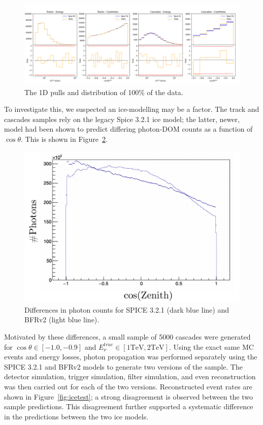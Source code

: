 \documentclass[main.tex]{subfiles}
\begin{document}
\begin{figure}
    \centering
    \includegraphics[width=0.9\linewidth]{./figures/goodness_joint_data_full_IC86_data_full.png}
    \caption{The 1D pulls and distribution of 100\% of the data.}\label{fig:1d_100p_distrib}
\end{figure}


To investigate this, we suspected an ice-modelling may be a factor. 
The track and cascades samples rely on the legacy Spice 3.2.1 ice model; the latter, newer, model had been shown to predict differing photon-DOM counts as a function of $\cos\theta$.  
This is shown in Figure~\ref{fig:zenith_bfr}.

\begin{figure}
    \centering
    \includegraphics[width=0.75\linewidth]{./figures/ice_investigate/zenith_bfr.png}
    \caption{Differences in photon counts for SPICE 3.2.1 (dark blue line) and BFRv2 (light blue line).}\label{fig:zenith_bfr}
\end{figure}

Motivated by these differences, a small sample of 5000 cascades were generated for $\cos\theta\in\left[-1.0, -0.9\right]$ and $E_{\nu}^{true}\in\left[1\text{TeV}, 2\text{TeV}\right]$. 
Using the exact same MC events and energy losses, photon propagation was performed separately using the SPICE 3.2.1 and BFRv2 models to generate two versions of the sample.
The detector simulation, trigger simulation, filter simulation, and even reconstruction was then carried out for each of the two versions. 
Reconstructed event rates are shown in Figure~\ref{fig:icetest}; a strong disagreement is observed between the two sample predictions. 
This disagreement further supported a systematic difference in the predictions between the two ice models. 
\end{document}

